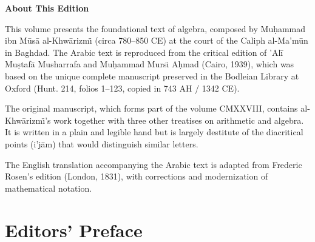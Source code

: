\documentclass[11pt,a4paper]{book}
\begin{document}
\thispagestyle{empty}
\begin{center}
\vspace*{3cm}

{\Large\textbf{About This Edition}}

\vspace{1cm}

\begin{minipage}{0.8\textwidth}
\small
This volume presents the foundational text of algebra, composed by
Mu\d{h}ammad ibn M\=us\=a al-Khw\=arizm\"{\i} (circa 780--850 CE) at the court
of the Caliph al-Ma'm\=un in Baghdad. The Arabic text is reproduced
from the critical edition of 'Al\=i Mu\d{s}taf\=a Musharrafa and
Mu\d{h}ammad Murs\"{\i} A\d{h}mad (Cairo, 1939), which was based on the
unique complete manuscript preserved in the Bodleian Library at Oxford
(Hunt. 214, folios 1--123, copied in 743 AH / 1342 CE).

\vspace{0.5cm}

The original manuscript, which forms part of the volume CMXXVIII,
contains al-Khw\=arizm\"{\i}'s work together with three other treatises
on arithmetic and algebra. It is written in a plain and legible hand
but is largely destitute of the diacritical points (i'j\=am) that
would distinguish similar letters.

\vspace{0.5cm}

The English translation accompanying the Arabic text is adapted from
Frederic Rosen's edition (London, 1831), with corrections and
modernization of mathematical notation.
\end{minipage}
\end{center}

\newpage

\tableofcontents
\newpage

\chapter*{Editors' Preface}
\end{document}

